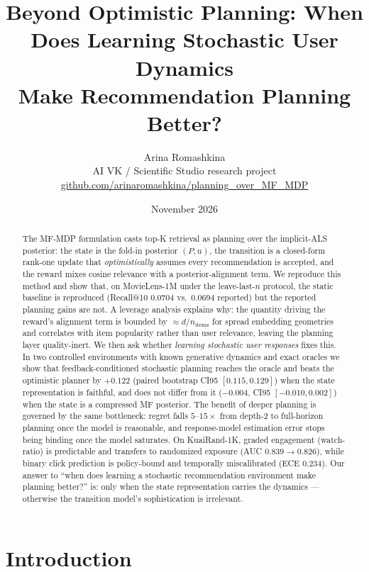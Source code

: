 \documentclass[11pt,a4paper]{article}
\title{Beyond Optimistic Planning: When Does Learning Stochastic User Dynamics\\
Make Recommendation Planning Better?}
\author{Arina Romashkina\\
\small AI VK / Scientific Studio research project\\
\small \url{github.com/arinaromashkina/planning_over_MF_MDP}}
\date{November 2026}
\begin{document}
\maketitle

\begin{abstract}
The MF-MDP formulation casts top-K retrieval as planning over the implicit-ALS
posterior: the state is the fold-in posterior $(P,u)$, the transition is a closed-form
rank-one update that \emph{optimistically} assumes every recommendation is accepted, and
the reward mixes cosine relevance with a posterior-alignment term. We reproduce this
method and show that, on MovieLens-1M under the leave-last-$n$ protocol, the static
baseline is reproduced (Recall@10 0.0704 vs.\ 0.0694 reported) but the reported planning
gains are not. A leverage analysis explains why: the quantity driving the reward's
alignment term is bounded by $\approx d/n_{\text{items}}$ for spread embedding
geometries and correlates with item popularity rather than user relevance, leaving the
planning layer quality-inert. We then ask whether \emph{learning stochastic user
responses} fixes this. In two controlled environments with known generative dynamics and
exact oracles we show that feedback-conditioned stochastic planning reaches the oracle
and beats the optimistic planner by $+0.122$ (paired bootstrap CI95 $[0.115, 0.129]$)
when the state representation is faithful, and does not differ from it ($-0.004$, CI95
$[-0.010, 0.002]$) when the state is a compressed MF posterior. The benefit of deeper
planning is governed by the same bottleneck: regret falls $5$--$15\times$ from depth-2 to
full-horizon planning once the model is reasonable, and response-model estimation error
stops being binding once the model saturates. On KuaiRand-1K, graded engagement
(watch-ratio) is predictable and transfers to randomized exposure (AUC $0.839 \to
0.826$), while binary click prediction is policy-bound and temporally miscalibrated
(ECE $0.234$). Our answer to ``when does learning a stochastic recommendation environment
make planning better?'' is: only when the state representation carries the dynamics ---
otherwise the transition model's sophistication is irrelevant.
\end{abstract}

\section{Introduction}
\end{document}
